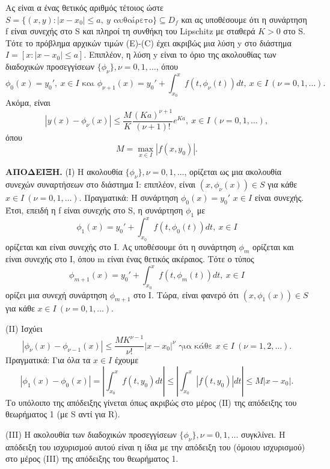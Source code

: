 \documentclass[11pt,a4paper,twoside]{book}
\newcommand{\titlefont}[1]{{\fontfamily{maksf}\selectfont #1}}
\newcounter{thewrhma}[chapter]
\renewcommand{\thethewrhma}{\thechapter.\arabic{thewrhma}}
\newcommand{\thewr}{\refstepcounter{thewrhma}{\bf\titlefont{\textcolor{secondarycolor}{\large Θεώρημα\hspace{2mm}\thethewrhma}}}\hspace{1mm}}{}
\newenvironment{Thewrhma}[1]
{\begin{tcolorbox}[title=\thewr\ \ :\ \  {\textcolor{black}{\bf{\large\titlefont{#1}}}},
breakable,
enhanced standard,
titlerule=-.2pt,
toprule=0pt, 
rightrule=0pt, 
bottomrule=0pt,
colback=white,
left=2mm,
top=1mm,
bottom=0mm,
boxrule=0pt,
colframe=white,
borderline west={1.5mm}{0pt}{secondarycolor},
leftrule=2mm,
sharp corners,
coltitle=secondarycolor]}
{\end{tcolorbox}}
\begin{document}
\begin{Thewrhma}{Θεώρημα ...}
Ας είναι α ένας θετικός αριθμός τέτοιος ώστε
$S = \{(x,y):|x-x_0| \le a, \ y \text{ αυθαίρετο}\} \subseteq D_f$
\newline
και ας υποθέσουμε ότι η συνάρτηση f είναι συνεχής στο S και πληροί τη συνθήκη του Lipschitz με σταθερά $K>0$ στο S.
\newline
\newline
Τότε το πρόβλημα αρχικών τιμών (E)-(C) έχει ακριβώς μια λύση y στο διάστημα $I=[x: |x-x_0| \le a]$. Επιπλέον, η λύση y είναι το όριο της ακολουθίας των διαδοχικών προσεγγίσεων $\{\phi_\nu\}, \nu=0,1,\dots$, όπου
\[
\phi_0(x) = y_0', \ x \in I \text{ και } \phi_{\nu+1}(x) = y_0' + \int_{x_0}^x f(t, \phi_\nu(t))dt, \ x \in I \ (\nu=0,1,\dots).
\]
Ακόμα, είναι
\[
|y(x)-\phi_\nu(x)| \le \frac{M}{K} \frac{(Ka)^{\nu+1}}{(\nu+1)!}e^{Ka}, \ x \in I \ (\nu=0,1,\dots),
\]
όπου
\[
M = \max_{x \in I} |f(x,y_0)|.
\]
\end{Thewrhma}
\textbf{ΑΠΟΔΕΙΞΗ.} (I) Η ακολουθία $\{\phi_\nu\}, \nu=0,1,\dots$, ορίζεται ως μια ακολουθία συνεχών συναρτήσεων στο διάστημα Ι: επιπλέον, είναι $(x, \phi_\nu(x)) \in S$ για κάθε $x \in I \ (\nu=0,1,\dots)$. Πραγματικά: Η συνάρτηση $\phi_0(x)=y_0'$ $x \in I$ είναι συνεχής. Έτσι, επειδή η f είναι συνεχής στο S, η συνάρτηση $\phi_1$ με
\[
\phi_1(x) = y_0' + \int_{x_0}^x f(t, \phi_0(t))dt, \ x \in I
\]
ορίζεται και είναι συνεχής στο Ι. Ας υποθέσουμε ότι η συνάρτηση $\phi_m$ ορίζεται και είναι συνεχής στο Ι, όπου m είναι ένας θετικός ακέραιος. Τότε ο τύπος
\[
\phi_{m+1}(x) = y_0' + \int_{x_0}^x f(t, \phi_m(t))dt, \ x \in I
\]
ορίζει μια συνεχή συνάρτηση $\phi_{m+1}$ στο Ι. Τώρα, είναι φανερό ότι $(x, \phi_1(x)) \in S$ για κάθε $x \in I \ (\nu=0,1,\dots)$.

(II) Ισχύει
\[
|\phi_\nu(x)-\phi_{\nu-1}(x)| \le \frac{MK^{\nu-1}}{\nu!}|x-x_0|^\nu \text{ για κάθε } x \in I \ (\nu=1,2,\dots).
\]
Πραγματικά: Για όλα τα $x \in I$ έχουμε
\[
|\phi_1(x)-\phi_0(x)| = \left|\int_{x_0}^x f(t,y_0)dt\right| \le \left|\int_{x_0}^x |f(t,y_0)|dt\right| \le M|x-x_0|.
\]
Το υπόλοιπο της απόδειξης γίνεται όπως ακριβώς στο μέρος (ΙΙ) της απόδειξης του θεωρήματος 1 (με S αντί για R).

(III) Η ακολουθία των διαδοχικών προσεγγίσεων $\{\phi_\nu\}, \nu=0,1,\dots$ συγκλίνει. Η απόδειξη του ισχυρισμού αυτού είναι η ίδια με την απόδειξη του (όμοιου ισχυρισμού) στο μέρος (III) της απόδειξης του θεωρήματος 1.
\end{document}

